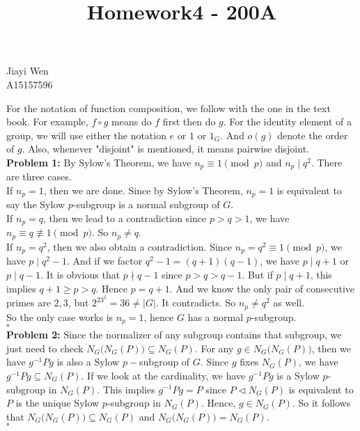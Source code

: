 \documentclass[12pt]{amsart}
\newcommand{\normal}{\triangleleft}
\begin{document}
\title{Homework4 - 200A}
\maketitle
\begin{center}
    Jiayi Wen\\
    A15157596
\end{center}
\indent For the notation of function composition, we follow with the one in the text book. For example, $f \circ g$ means do $f$ first then do $g$. For the identity element of a group, we will use either the notation $e$ or $1$ or $1_G$. And $o(g)$ denote the order of $g$. Also, whenever "disjoint" is mentioned, it means pairwise disjoint.\\
\textbf{Problem 1:} By Sylow's Theorem, we have $n_p\equiv 1\pmod p$ and $n_p\mid q^2$. There are three cases.\\
If $n_p=1$, then we are done. Since by Sylow's Theorem, $n_p=1$ is equivalent to say the Sylow $ p$-subgroup is a normal subgroup of $G$.\\
If $n_p=q$, then we lead to a contradiction since $p>q>1$, we have $n_p\equiv q\not\equiv 1\pmod p$. So $n_p\neq q$.\\
If $n_p=q^2$, then we also obtain a contradiction. Since $n_p=q^2\equiv 1\pmod p$, we have $p\mid q^2-1$. And if we factor $q^2-1=(q+1)(q-1)$, we have $p\mid q+1$ or $p\mid q-1$. It is obvious that $p\nmid q-1$ since $p>q>q-1$. But if $p\mid q+1$, this implies $q+1\geq p>q$. Hence $p=q+1$. And we know the only pair of consecutive primes are $2,3$, but $2^23^2=36\neq |G|$. It contradicts. So $n_p\neq q^2$ as well.\\
So the only case works is $n_p=1$, hence $G$ has a normal $p$-subgroup.
\\\phantom{qed}\hfill$\square$\\
\textbf{Problem 2:} Since the normalizer of any subgroup contains that subgroup, we just need to check $N_G\big(N_G(P)\big)\subseteq N_G(P)$. For any $g\in N_G\big(N_G(P)\big)$, then we have $g^{-1}Pg$ is also a Sylow $p-$subgroup of $G$. Since $g$ fixes $N_G(P)$, we have $g^{-1}Pg\subseteq N_G(P)$. If we look at the cardinality, we have $g^{-1}Pg$ is a Sylow $p$-subgroup in $N_G(P)$. This implies $g^{-1}Pg=P$ since $P\normal N_G(P)$ is equivalent to $P$ is the unique Sylow $p$-subgroup in $N_G(P)$. Hence, $g\in N_G(P)$. So it follows that $N_G\big(N_G(P)\big)\subseteq N_G(P)$ and $N_G\big(N_G(P)\big)=N_G(P)$.
\\\phantom{qed}\hfill$\square$\\
\end{document}
